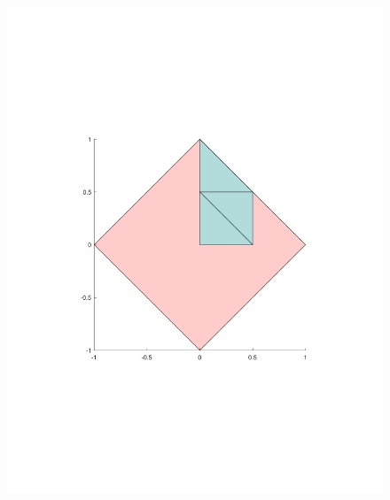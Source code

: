 \documentclass[9pt]{beamer}
\begin{document}
\begin{frame}
\begin{columns}[T, onlytextwidth]
\begin{column}{0.5\textwidth}
\begin{figure}
				\includegraphics[width=\linewidth]{part3.pdf}
			\end{figure}
		\end{column}
		

\end{columns}
\end{frame}
\end{document}

